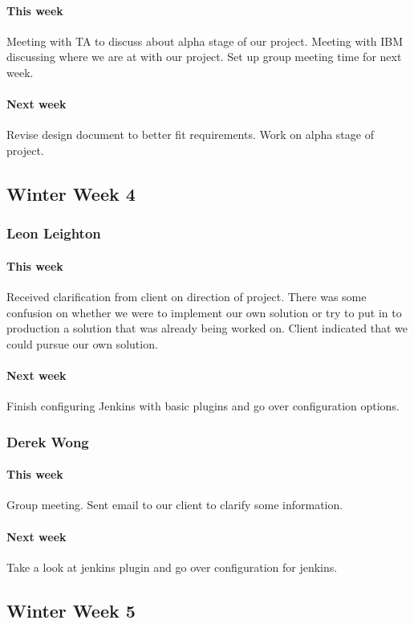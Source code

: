 \documentclass[10pt,letterpaper,onecolumn,draftclsnofoot]{IEEEtran}
\begin{document}
\paragraph{This week}Meeting with TA to discuss about alpha stage of our project.  
Meeting with IBM discussing where we are at with our project.   
Set up group meeting time for next week.
\paragraph{Next week}Revise design document to better fit requirements.   
Work on alpha stage of project.


\subsection{Winter Week 4}
\subsubsection{Leon Leighton}
\paragraph{This week}Received clarification from client on direction of project. There was some confusion on whether we were to implement our own solution or try to put in to production a solution that was already being worked on. Client indicated that we could pursue our own solution.
\paragraph{Next week}Finish configuring Jenkins with basic plugins and go over configuration options.

\subsubsection{Derek Wong}
\paragraph{This week}Group meeting.    
Sent email to our client to clarify some information.
\paragraph{Next week}Take a look at jenkins plugin and go over configuration for jenkins.


\subsection{Winter Week 5}
\end{document}
